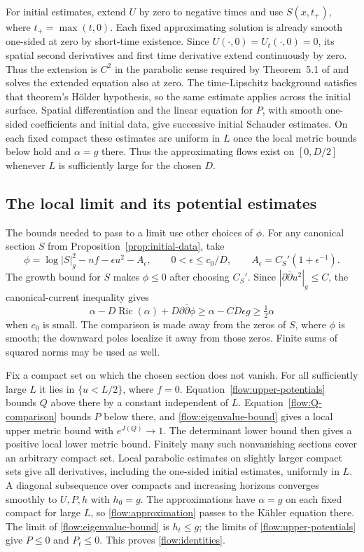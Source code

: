 \documentclass[11pt]{article}
\theoremstyle{definition}
\theoremstyle{remark}
\newcommand{\dd}{\partial\bar\partial}
\DeclareMathOperator{\Ric}{Ric}
\numberwithin{equation}{section}
\begin{document}
For initial estimates, extend $U$ by zero to negative times and use
$S(x,t_+)$, where $t_+=\max(t,0)$.  Each fixed approximating solution
is already smooth one-sided at zero by short-time existence.
Since $U(\cdot,0)=U_t(\cdot,0)=0$, its spatial second derivatives
and first time derivative extend continuously by zero.  Thus the
extension is $C^2$ in the parabolic sense required by Theorem~5.1
of \cite{ChuRegularity} and solves the extended equation also at zero.
The time-Lipschitz background satisfies that theorem's H\"older
hypothesis, so the same estimate applies across the initial surface.
Spatial differentiation and the linear equation for $P$, with smooth
one-sided coefficients and initial data, give successive initial
Schauder estimates.  On each fixed compact these estimates are
uniform in $L$ once the local metric bounds below hold and $\alpha=g$
there.  Thus the approximating flows exist on $[0,D/2]$ whenever
$L$ is sufficiently large for the chosen $D$.

\subsection{The local limit and its potential estimates}

The bounds needed to pass to a limit use other choices of $\phi$.
For any canonical section $S$ from
Proposition~\ref{prop:initial-data}, take
\begin{equation}\label{flow:singular-weight}
 \phi=\log|S|_g^2-nf-\epsilon u^2-A_\epsilon,
 \qquad 0<\epsilon\le c_0/D,
 \qquad A_\epsilon=C_S'(1+\epsilon^{-1}).
\end{equation}
The growth bound for $S$ makes $\phi\le0$ after choosing $C_S'$.
Since $|\dd u^2|_g\le C$, the canonical-current inequality gives
\[
 \alpha-D\Ric(\alpha)+D\dd\phi
 \ge\alpha-CD\epsilon g\ge\tfrac12\alpha
\]
when $c_0$ is small.  The comparison is made away from the zeros of
$S$, where $\phi$ is smooth; the downward poles localize it away
from those zeros.  Finite sums of squared norms may be used as well.

Fix a compact set on which the chosen section does not vanish.
For all sufficiently large $L$ it lies in $\{u<L/2\}$, where $f=0$.
Equation~\eqref{flow:upper-potentials} bounds $Q$ above there by a
constant independent of $L$.  Equation~\eqref{flow:Q-comparison}
bounds $P$ below there, and \eqref{flow:eigenvalue-bound} gives a local
upper metric bound with $e^{J(Q)}\to1$.  The determinant lower bound
then gives a positive local lower metric bound.  Finitely many such
nonvanishing sections cover an arbitrary compact set.  Local
parabolic estimates on slightly larger compact sets give all
derivatives, including the one-sided initial estimates, uniformly
in $L$.  A diagonal subsequence over compacts and increasing horizons
converges smoothly to $U,P,h$ with $h_0=g$.  The approximations have
$\alpha=g$ on each fixed compact for large $L$, so
\eqref{flow:approximation} passes to the K\"ahler equation there.
The limit of \eqref{flow:eigenvalue-bound} is $h_t\le g$;
the limits of \eqref{flow:upper-potentials} give $P\le0$ and $P_t\le0$.
This proves \eqref{flow:identities}.
\end{document}
